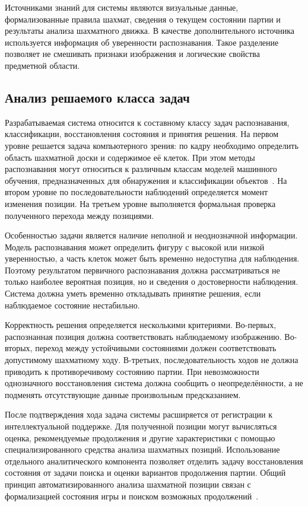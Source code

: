 Источниками знаний для системы являются визуальные данные, формализованные правила шахмат, сведения о текущем состоянии партии и результаты анализа шахматного движка. В качестве дополнительного источника используется информация об уверенности распознавания. Такое разделение позволяет не смешивать признаки изображения и логические свойства предметной области.

\subsection{Анализ решаемого класса задач}

Разрабатываемая система относится к составному классу задач распознавания, классификации, восстановления состояния и принятия решения. На первом уровне решается задача компьютерного зрения: по кадру необходимо определить область шахматной доски и содержимое её клеток. При этом методы распознавания могут относиться к различным классам моделей машинного обучения, предназначенных для обнаружения и классификации объектов~\cite{Goodfellow2016}. На втором уровне по последовательности наблюдений определяется момент изменения позиции. На третьем уровне выполняется формальная проверка полученного перехода между позициями.

Особенностью задачи является наличие неполной и неоднозначной информации. Модель распознавания может определить фигуру с высокой или низкой уверенностью, а часть клеток может быть временно недоступна для наблюдения. Поэтому результатом первичного распознавания должна рассматриваться не только наиболее вероятная позиция, но и сведения о достоверности наблюдения. Система должна уметь временно откладывать принятие решения, если наблюдаемое состояние нестабильно.

Корректность решения определяется несколькими критериями. Во-первых, распознанная позиция должна соответствовать наблюдаемому изображению. Во-вторых, переход между устойчивыми состояниями должен соответствовать допустимому шахматному ходу. В-третьих, последовательность ходов не должна приводить к противоречивому состоянию партии. При невозможности однозначного восстановления система должна сообщить о неопределённости, а не подменять отсутствующие данные произвольным предсказанием.

После подтверждения хода задача системы расширяется от регистрации к интеллектуальной поддержке. Для полученной позиции могут вычисляться оценка, рекомендуемые продолжения и другие характеристики с помощью специализированного средства анализа шахматных позиций. Использование отдельного аналитического компонента позволяет отделить задачу восстановления состояния от задачи поиска и оценки вариантов продолжения партии. Общий принцип автоматизированного анализа шахматной позиции связан с формализацией состояния игры и поиском возможных продолжений~\cite{Shannon1950}.

